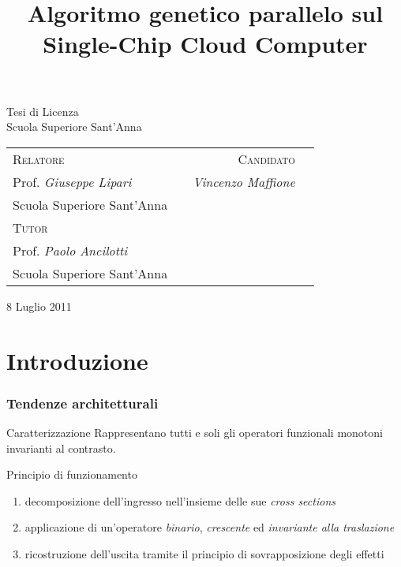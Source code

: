 \documentclass{beamer}
\title[Algoritmo genetico parallelo sul Single-Chip Cloud Computer]{Algoritmo genetico parallelo sul Single-Chip Cloud Computer}
\author[\hspace{2em} Vincenzo Maffione\hspace{3.6cm} Tesi di Licenza \hspace{2.5cm} 8 Luglio 2011]{}
\date{}
\begin{document}
\begin{frame}
\vspace*{-0.1cm}
    \titlepage
\vspace*{-2.6cm}

\begin{center}
{\footnotesize Tesi di Licenza\\
Scuola Superiore Sant'Anna}
\end{center}

\begin{center}
\begin{tabular}{l p{2.5cm} r c}

\footnotesize\textsc{Relatore} & & \footnotesize\textsc{Candidato} \\
{\small Prof. \textit{Giuseppe Lipari}} & &\small\textit{Vincenzo Maffione}\\
\vspace{0.4em}
{\footnotesize Scuola Superiore Sant'Anna} & &\\
\footnotesize\textsc{Tutor} & &  \\
{\small Prof. \textit{Paolo Ancilotti}} && \\
{\footnotesize Scuola Superiore Sant'Anna} && \\
\end{tabular}
\end{center}

\begin{center}
{\small 8 Luglio 2011}
\end{center}

\end{frame}


\section{Introduzione}

\begin{frame}
  \frametitle{Tendenze architetturali}

  \begin{block}{Caratterizzazione}
Rappresentano tutti e soli gli operatori funzionali monotoni \alert{invarianti al contrasto}.
  \end{block}

  \begin{block}{Principio di funzionamento}
    \begin{enumerate}

      \item decomposizione dell'ingresso nell'insieme delle sue \emph{cross sections}

      \item applicazione di un'operatore \emph{binario}, \emph{crescente} ed \emph{invariante alla traslazione}

      \item ricostruzione dell'uscita tramite il principio di sovrapposizione degli effetti

    \end{enumerate}
  \end{block}
\end{frame}
\end{document}

